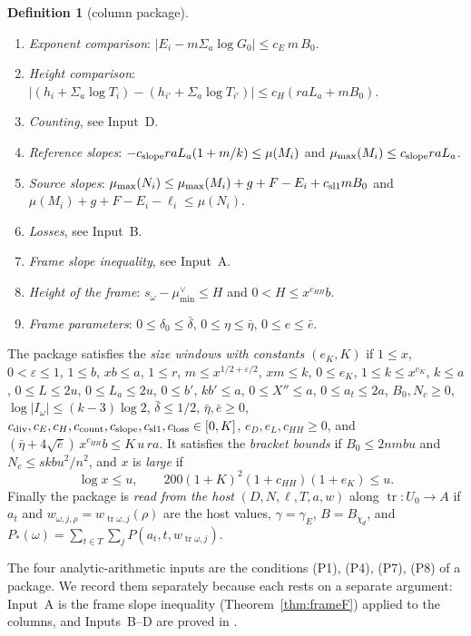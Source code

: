 \documentclass[10pt]{amsart}
\theoremstyle{definition}
\newtheorem{definition}[theorem]{Definition}
\theoremstyle{remark}
\begin{document}
\begin{definition}[column package]
\begin{enumerate}
\item[(P2)] \emph{Exponent comparison}:
$|E_i-m\Sigma_a\log G_0|\le c_E\,m\,B_0$.
\item[(P3)] \emph{Height comparison}:
$|(h_i+\Sigma_a\log T_i)-(h_{i'}+\Sigma_a\log T_{i'})|\le c_H(raL_a+mB_0)$.
\item[(P4)] \emph{Counting},
see Input~D.
\item[(P5)] \emph{Reference slopes}:
$-c_{\rm slope}raL_a(1+m/k)\le\mu(M_i)$ and $\mu_{\max}(M_i)\le c_{\rm slope}raL_a$.
\item[(P6)] \emph{Source slopes}:
$\mu_{\max}(N_i)\le\mu_{\max}(M_i)+g+F-E_i+c_{\rm sl1}mB_0$ and
$\mu(M_i)+g+F-E_i-\ell_i\le\mu(N_i)$.
\item[(P7)] \emph{Losses},
see Input~B.
\item[(P8)] \emph{Frame slope inequality},
see Input~A.
\item[(P9)] \emph{Height of the frame}:
$s_\omega-\mu^\vee_{\min}\le H$ and $0<H\le x^{c_{HH}}b$.
\item[(P10)] \emph{Frame parameters}:
$0\le\delta_0\le\bar\delta$, $0\le\eta\le\bar\eta$, $0\le e\le\bar e$.
\end{enumerate}
The package satisfies the \emph{size windows with constants $(e_K,K)$} if
$1\le x$, $0<\varepsilon\le1$, $1\le b$, $xb\le a$, $1\le r$,
$m\le x^{1/2+\varepsilon/2}$, $xm\le k$, $0\le e_K$, $1\le k\le x^{e_K}$,
$k\le a$, $0\le L\le2u$, $0\le L_a\le2u$, $0\le b'$, $kb'\le a$,
$0\le X''\le a$, $0\le a_t\le2a$, $B_0,N_c\ge0$,
$\log|I_\omega|\le(k-3)\log2$, $\bar\delta\le1/2$, $\bar\eta,\bar e\ge0$,
$c_{\rm div},c_E,c_H,c_{\rm count},c_{\rm slope},c_{\rm sl1},c_{\rm loss}\in[0,K]$,
$e_D,e_L,c_{HH}\ge0$, and
$(\bar\eta+4\sqrt{\bar e})\,x^{c_{HH}}b\le K\,u\,ra$.
It satisfies the \emph{bracket bounds} if $B_0\le2nmbu$ and $N_c\le skbu^2/n^2$, and
$x$ is \emph{large} if
\begin{equation}\label{eq:assembly-largeX}
 \log x\le u,\qquad 200(1+K)^2(1+c_{HH})(1+e_K)\le u .
\end{equation}
Finally the package is \emph{read from the host} $(D,N,\ell,T,a,w)$ along $\operatorname{tr}:U_0\to A$
if $a_t$ and $w_{\omega,j,\rho}=w_{\operatorname{tr}\omega,j}(\rho)$ are the host
values, $\gamma=\gamma_E$, $B=B_{\chi_d}$, and
$P_*(\omega)=\sum_{t\in T}\sum_jP(a_t,t,w_{\operatorname{tr}\omega,j})$.
\end{definition}

The four analytic-arithmetic inputs are the conditions (P1), (P4), (P7),
(P8) of a package. We record them separately because each rests on a
separate argument: Input~A is the frame slope inequality
(Theorem~\ref{thm:frameF}) applied to the columns, and Inputs~B--D are
proved in \cite{Annex}.
\end{document}
